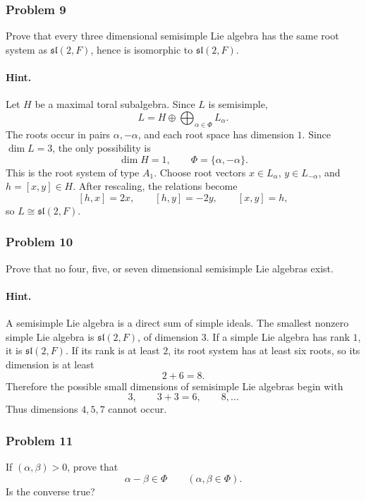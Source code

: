 \documentclass[12pt, a4paper]{article}
\begin{document}
\subsubsection{Problem 9}

Prove that every three dimensional semisimple Lie algebra has the same root
system as \(\mathfrak{sl}(2,F)\), hence is isomorphic to \(\mathfrak{sl}(2,F)\).

\paragraph{Hint.}
Let \(H\) be a maximal toral subalgebra. Since \(L\) is semisimple,
\[
L=H\oplus \bigoplus_{\alpha\in\Phi}L_\alpha.
\]
The roots occur in pairs \(\alpha,-\alpha\), and each root space has dimension
\(1\). Since \(\dim L=3\), the only possibility is
\[
\dim H=1,
\qquad
\Phi=\{\alpha,-\alpha\}.
\]
This is the root system of type \(A_1\). Choose root vectors
\(x\in L_\alpha\), \(y\in L_{-\alpha}\), and \(h=[x,y]\in H\). After rescaling,
the relations become
\[
[h,x]=2x,\qquad [h,y]=-2y,\qquad [x,y]=h,
\]
so \(L\cong \mathfrak{sl}(2,F)\).

\subsubsection{Problem 10}

Prove that no four, five, or seven dimensional semisimple Lie algebras exist.

\paragraph{Hint.}
A semisimple Lie algebra is a direct sum of simple ideals. The smallest
nonzero simple Lie algebra is \(\mathfrak{sl}(2,F)\), of dimension \(3\). If a
simple Lie algebra has rank \(1\), it is \(\mathfrak{sl}(2,F)\). If its rank is
at least \(2\), its root system has at least six roots, so its dimension is at
least
\[
2+6=8.
\]
Therefore the possible small dimensions of semisimple Lie algebras begin with
\[
3,\qquad 3+3=6,\qquad 8,\ldots
\]
Thus dimensions \(4,5,7\) cannot occur.

\subsubsection{Problem 11}

If \((\alpha,\beta)>0\), prove that
\[
\alpha-\beta\in \Phi
\qquad (\alpha,\beta\in\Phi).
\]
Is the converse true?
\end{document}
